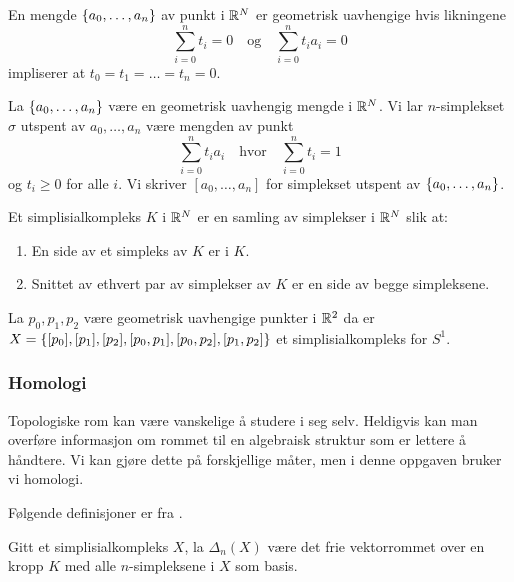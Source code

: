 \begin{definisjon}\label{def:GeoUav}
  En mengde $\left\{a_0,\dots,a_n\right\}$ av punkt i $\mathbb{R}^N$ er
  geometrisk uavhengige hvis likningene
  \[\sum_{i=0}^nt_i
  = 0\quad\text{og}\quad\sum_{i=0}^nt_ia_i=0\]
  impliserer at $t_0=t_1=\dots=t_n=0$.
\end{definisjon}

\begin{definisjon}\label{def:n-simp} 
  La $\left\{a_0,\dots,a_n\right\}$ være en geometrisk uavhengig mengde
  i $\mathbb{R}^N$. Vi lar $n$-simplekset $\sigma$ utspent av
  $a_0,\dots,a_n$ være mengden av punkt
  \[\sum_{i=0}^nt_ia_i\quad\text{hvor}\quad\sum_{i=0}^nt_i = 1\]
  og $t_i\geq0$ for alle $i$. Vi skriver $[a_0,\dots,a_n]$ for
  simplekset utspent av $\left\{a_0,\dots,a_n\right\}$.
\end{definisjon}

\begin{definisjon}\label{def:SimpKomp}
  Et simplisialkompleks $K$ i $\mathbb{R}^N$ er en samling av simplekser
  i $\mathbb{R}^N$ slik at:
  \begin{enumerate}
    \item En side av et simpleks av $K$ er i $K$.\\
    \item Snittet av ethvert par av simplekser av $K$ er en side
      av begge simpleksene.
  \end{enumerate}
\end{definisjon}

\begin{eksempel}\label{eks:Sirkel}
  La $p_0,p_1,p_2$ være geometrisk uavhengige punkter
  i $\mathbb{R}^2$ da er $X
  = \left\{[p_0],[p_1],[p_2],[p_0,p_1],[p_0,p_2],[p_1,p_2]\right\}$ et
  simplisialkompleks for $S^1$.
\end{eksempel}

\subsubsection{Homologi}
Topologiske rom kan være vanskelige å studere i seg selv.
Heldigvis kan man overføre informasjon om rommet til en algebraisk
struktur som er lettere å håndtere. Vi kan gjøre dette på
forskjellige måter, men i denne oppgaven bruker vi
homologi. 

Følgende definisjoner er fra \citep[seksjon
2.1]{Hatcher2001}.

\begin{definisjon}\label{def:KjdKomp}
  Gitt et simplisialkompleks $X$, la $\Delta_n(X)$ være
  det frie vektorrommet over en kropp $K$ med alle
  $n$-simpleksene i $X$ som basis.
\end{definisjon}

